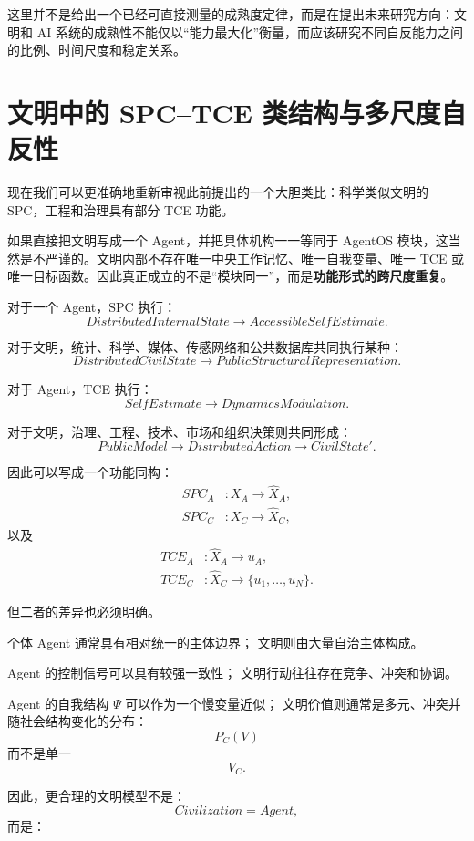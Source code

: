 这里并不是给出一个已经可直接测量的成熟度定律，而是在提出未来研究方向：文明和 AI 系统的成熟性不能仅以“能力最大化”衡量，而应该研究不同自反能力之间的比例、时间尺度和稳定关系。


\section{文明中的 SPC--TCE 类结构与多尺度自反性}

现在我们可以更准确地重新审视此前提出的一个大胆类比：科学类似文明的 SPC，工程和治理具有部分 TCE 功能。

如果直接把文明写成一个 Agent，并把具体机构一一等同于 AgentOS 模块，这当然是不严谨的。文明内部不存在唯一中央工作记忆、唯一自我变量、唯一 TCE 或唯一目标函数。因此真正成立的不是“模块同一”，而是\textbf{功能形式的跨尺度重复}。

对于一个 Agent，SPC 执行：
\[
DistributedInternalState
\rightarrow
AccessibleSelfEstimate.
\]

对于文明，统计、科学、媒体、传感网络和公共数据库共同执行某种：
\[
DistributedCivilState
\rightarrow
PublicStructuralRepresentation.
\]

对于 Agent，TCE 执行：
\[
SelfEstimate
\rightarrow
DynamicsModulation.
\]

对于文明，治理、工程、技术、市场和组织决策则共同形成：
\[
PublicModel
\rightarrow
DistributedAction
\rightarrow
CivilState'.
\]

因此可以写成一个功能同构：
\[
\begin{aligned}
SPC_A
&:
X_A\rightarrow \hat X_A,\\
SPC_C
&:
X_C\rightarrow \hat X_C,
\end{aligned}
\]
以及
\[
\begin{aligned}
TCE_A
&:
\hat X_A\rightarrow u_A,\\
TCE_C
&:
\hat X_C\rightarrow \{u_1,\ldots,u_N\}.
\end{aligned}
\]

但二者的差异也必须明确。

个体 Agent 通常具有相对统一的主体边界；
文明则由大量自治主体构成。

Agent 的控制信号可以具有较强一致性；
文明行动往往存在竞争、冲突和协调。

Agent 的自我结构 $\Psi$ 可以作为一个慢变量近似；
文明价值则通常是多元、冲突并随社会结构变化的分布：
\[
P_C(V)
\]
而不是单一
\[
V_C.
\]

因此，更合理的文明模型不是：
\[
Civilization=Agent,
\]
而是：
\begin{statementbox}
\centering
{}
\end{statementbox}


